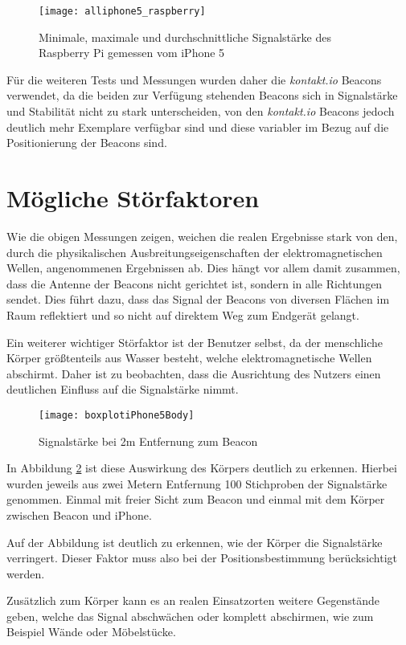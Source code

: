\begin{figure}[htb!]
		\centering
	\texttt{[image: alliphone5\_raspberry]}
	\caption{Minimale, maximale und durchschnittliche Signalstärke des Raspberry Pi gemessen vom iPhone 5}
	\label{alliphone5_raspberry}
\end{figure}

Für die weiteren Tests und Messungen wurden daher die \emph{kontakt.io} Beacons verwendet, da die beiden zur Verfügung stehenden Beacons sich in Signalstärke und Stabilität nicht zu stark unterscheiden, von den \emph{kontakt.io} Beacons jedoch deutlich mehr Exemplare verfügbar sind und diese variabler im Bezug auf die Positionierung der Beacons sind.


\section{Mögliche Störfaktoren}
\label{sec:dataandmeasurement:interferencefactor}
Wie die obigen Messungen zeigen, weichen die realen Ergebnisse stark von den, durch die physikalischen Ausbreitungseigenschaften der elektromagnetischen Wellen, angenommenen Ergebnissen ab. Dies hängt vor allem damit zusammen, dass die Antenne der Beacons nicht gerichtet ist, sondern in alle Richtungen sendet. Dies führt dazu, dass das Signal der Beacons von diversen Flächen im Raum reflektiert und so nicht auf direktem Weg zum Endgerät gelangt. 

Ein weiterer wichtiger Störfaktor ist der Benutzer selbst, da der menschliche Körper größtenteils aus Wasser besteht, welche elektromagnetische Wellen abschirmt. Daher ist zu beobachten, dass die Ausrichtung des Nutzers einen deutlichen Einfluss auf die Signalstärke nimmt. 

\begin{figure}[htb!]
		\centering
	\texttt{[image: boxplotiPhone5Body]}
	\caption{Signalstärke bei 2m Entfernung zum Beacon}
	\label{boxplotiPhone5Body}
\end{figure}

In Abbildung \ref{boxplotiPhone5Body} ist diese Auswirkung des Körpers deutlich zu erkennen. Hierbei wurden jeweils aus zwei Metern Entfernung 100 Stichproben der Signalstärke genommen. Einmal mit freier Sicht zum Beacon und einmal mit dem Körper zwischen Beacon und iPhone. 

Auf der Abbildung ist deutlich zu erkennen, wie der Körper die Signalstärke verringert. Dieser Faktor muss also bei der Positionsbestimmung berücksichtigt werden.

Zusätzlich zum Körper kann es an realen Einsatzorten weitere Gegenstände geben, welche das Signal abschwächen oder komplett abschirmen, wie zum Beispiel Wände oder Möbelstücke.